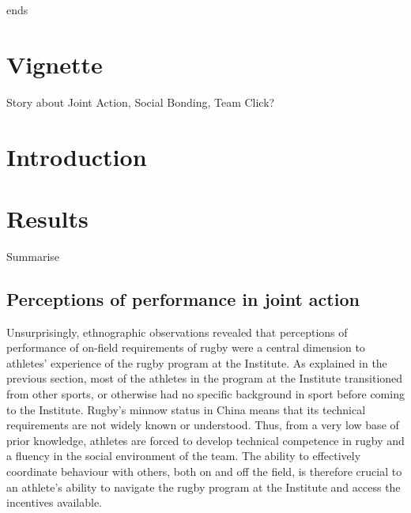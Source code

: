                                       \begin{CJK}{UTF8}{gbsn}
                                        ends


\section{Vignette}

Story about Joint Action, Social Bonding, Team Click?



\section{Introduction}








\section{Results}

Summarise


\subsection{Perceptions of performance in joint action}
Unsurprisingly, ethnographic observations revealed that perceptions of performance of on-field requirements of rugby were a central dimension to athletes' experience of the rugby program at the Institute.  As explained in the previous section, most of the athletes in the program at the Institute transitioned from other sports, or otherwise had no specific background in sport before coming to the Institute.  Rugby's minnow status in China means that its technical requirements are not widely known or understood.  Thus, from a very low base of prior knowledge, athletes are forced to develop technical competence in rugby and a fluency in the social environment of the team.  The ability to effectively coordinate behaviour with others, both on and off the field, is therefore crucial to an athlete's ability to navigate the rugby program at the Institute and access the incentives available.



\end{CJK}

